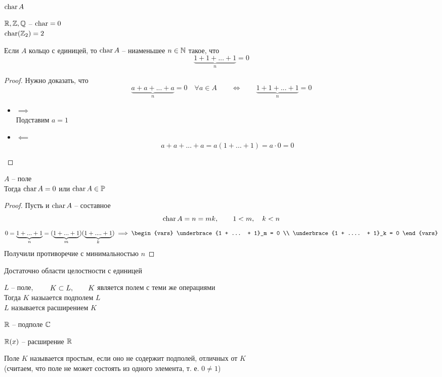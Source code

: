 \begin{definition}
	$ \operatorname{char} A $
\end{definition}

\begin{egs}
	$ \mathbb{R}, \mathbb{Z}, \mathbb{Q} $ -- $ \operatorname{char} = 0 $ \\
	$ \operatorname{char} (\mathbb{Z}_2) = 2 $
\end{egs}

\begin{property}
	Если $ A $ кольцо с единицей, то $ \operatorname{char} A $ -- ниаменьшее $ n \in \mathbb{N} $ такое, что
	$$ \underbrace{1 + 1 + ... + 1}_n = 0 $$
\end{property}

\begin{proof}
	Нужно доказать, что
	$$ \underbrace{a + a + ... + a}_n = 0 \quad \forall a \in A \qquad \iff \qquad \underbrace{1 + 1 + ... + 1}_n = 0 $$
	\begin{itemize}
		\item $ \implies $ \\
		Подставим $ a = 1 $
		\item $ \impliedby $
		$$ a + a + ... + a = a(1 + ... + 1) = a \cdot 0 = 0 $$
	\end{itemize}
\end{proof}

\begin{property}
	$ A $ -- поле \\
	Тогда $ \operatorname{char} A = 0 $ или $ \operatorname{char} A \in \mathbb{P} $
\end{property}

\begin{proof}
	Пусть  и $ \operatorname{char} A $ -- составное
	$$ \operatorname{char} A = n = mk, \qquad 1 < m, \quad k < n $$
	$$ 0 = \underbrace{1 + ... + 1}_n = (\underbrace{1 + ... + 1}_m)(\underbrace{1 + .... + 1}_k) \implies
	\begin{vars}
		\underbrace{1 + ... + 1}_m = 0 \\
		\underbrace{1 + .... + 1}_k = 0
	\end{vars} $$
	Получили противоречие с минимальностью $ n $
\end{proof}

\begin{note}
	Достаточно области целостности с единицей
\end{note}

\begin{definition}
	$ L $ -- поле, $ \qquad K \subset L, \qquad K $ является полем с теми же операциями \\
	Тогда $ K $ назыается подполем $ L $ \\
	$ L $ называется расширением $ K $
\end{definition}

\begin{exmpls}
	\item $ \mathbb{R} $ -- подполе $ \mathbb{C} $
	\item $ \mathbb{R}(x) $ -- расширение $ \mathbb{R} $
\end{exmpls}

\begin{definition}
	Поле $ K $ называется простым, если оно не содержит подполей, отличных от $ K $ \\
	(считаем, что поле не может состоять из одного элемента, т. е. $ 0 \ne 1 $)
\end{definition}
